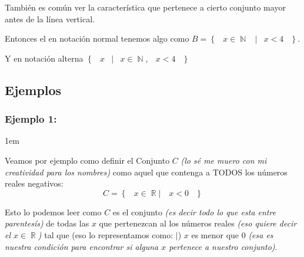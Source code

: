 \documentclass[12pt, fleqn]{report}                             %
\newenvironment{SmallIndentation}[1][0.75em]                    %
    {\begin{adjustwidth}{#1}{}\begin{footnotesize}}                 %
    {\end{footnotesize}\end{adjustwidth}}                           %
\DeclareMathOperator \Space {\quad}                             %
\DeclareMathOperator \MiniSpace {\;}                            %
\newcommand \Such {\MiniSpace|\MiniSpace}                       %
\newcommand{\Set}[1]{\left\{ \MiniSpace #1 \MiniSpace \right\}} %
\DeclareMathOperator \Naturals  {\mathbb{N}}                     %
\DeclareMathOperator \Reals     {\mathbb{R}}                     %
\begin{document}
                    También es común ver la característica que pertenece a cierto conjunto mayor
                    antes de la línea vertical.

                    Entonces el en notación normal tenemos algo como 
                    $B = \Set{ x \in \Naturals \Such x < 4 }$.

                    Y en notación alterna  $\Set{ x \Such x \in \Naturals, \MiniSpace x < 4}$


                
            \clearpage
            \subsection{Ejemplos} 


                \subsubsection*{Ejemplo 1:}
                    \begin{SmallIndentation}[1em]

                        Veamos por ejemplo como definir el Conjunto $C$ \emph{(lo sé me muero con
                        mi creatividad para los nombres)} como aquel que contenga a TODOS los números
                        reales negativos:
                        \begin{equation*}   
                            C = \Set{ x \in \Reals |\quad x < 0}
                        \end{equation*}

                        Esto lo podemos leer como $C$ es el conjunto \emph{(es decir todo lo que esta
                        entre parentesís)} de todas las $x$ que pertenezcan al los números reales
                        \emph{(eso quiere decir el $x \in \Reals$)} tal que (eso lo representamos
                        como: $|$) $x$ es menor que 0 \emph{(esa es nuestra condición para
                        encontrar si alguna $x$ pertenece a nuestro conjunto)}.

                    \end{SmallIndentation}

\end{document}
